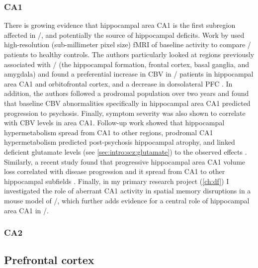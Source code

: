 \subsubsection{CA1}
There is growing evidence that hippocampal area CA1 is the first subregion affected in \scz/, and potentially the source of hippocampal deficits.
Work by \citeauthor{Schobel2009} used high-resolution (sub-millimeter pixel size) \ac{fMRI} of baseline activity to compare \scz/ patients to healthy controls.
The authors particularly looked at regions previously associated with \scz/ (the hippocampal formation, frontal cortex, basal ganglia, and amygdala) and found a preferential increase in \ac{CBV} in \scz/ patients in hippocampal area CA1 and orbitofrontal cortex, and a decrease in dorsolateral \ac{PFC} \citep{Schobel2009}.
In addition, the authors followed a prodromal population over two years and found that baseline \ac{CBV} abnormalities specifically in hippocampal area CA1 predicted progression to psychosis.
Finally, symptom severity was also shown to correlate with \ac{CBV} levels in area CA1.
Follow-up work showed that hippocampal hypermetabolism spread from CA1 to other regions, prodromal CA1 hypermetabolism predicted post-psychosis hippocampal atrophy, and linked deficient glutamate levels (see \autoref{sec:intro:scz:glutamate}) to the observed effects \citep{Schobel2013}.
Similarly, a recent study found that progressive hippocampal area CA1 volume loss correlated with disease progression and it spread from CA1 to other hippocampal subfields \citep{Ho2017}.
Finally, in my primary research project (\autoref{ch:df}) I investigated the role of aberrant CA1 activity in spatial memory disruptions in a mouse model of \scz/, which further adds evidence for a central role of hippocampal area CA1 in \scz/.

\subsubsection{CA2}

\subsection{Prefrontal cortex}

